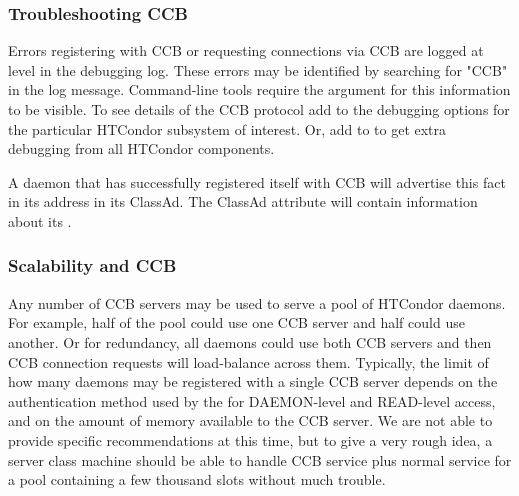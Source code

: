 \subsubsection{Troubleshooting CCB}

Errors registering with CCB or requesting connections via CCB are
logged at level  in the debugging log.
These errors may be identified by searching for "CCB" in the log message.
Command-line tools require the argument
 for this information to be visible.  To see details of
the CCB protocol add  to the debugging options for
the particular HTCondor subsystem of interest.
Or, add  to
 to get extra debugging from all HTCondor
components.

A daemon that has successfully registered itself with CCB will
advertise this fact in its address in its ClassAd.  
The ClassAd attribute  will contain information
about its .

\subsubsection{Scalability and CCB}

Any number of CCB servers may be used to serve a pool of HTCondor
daemons.  For example, half of the pool could use one CCB server and
half could use another.  Or for redundancy, all daemons could use both
CCB servers and then CCB connection requests will load-balance
across them.  Typically, the limit of how many daemons may be
registered with a single CCB server depends on the authentication
method used by the  for DAEMON-level and READ-level access,
and on the amount of memory available to the CCB server.  We are not
able to provide specific recommendations at this time, 
but to give a very rough idea,
a server class machine should be able to handle CCB
service plus normal  service for a pool containing
a few thousand slots without much trouble.

